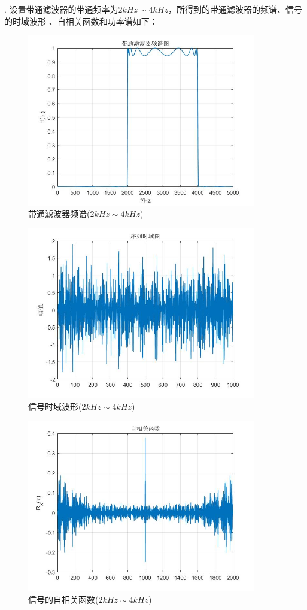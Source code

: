 \documentclass[UTF-8, a4paper, 12pt]{ctexart}
\begin{document}
. 设置带通滤波器的带通频率为$2kHz\sim 4kHz$，所得到的带通滤波器的频谱、信号的时域波形
、自相关函数和功率谱如下：
\begin{figure}[htbp]
    \centering
    \includegraphics[width=10cm]{figs/f21.jpg}
    \caption{带通滤波器频谱($2kHz\sim 4kHz$)}
\end{figure}
\begin{figure}[htbp]
    \centering
    \includegraphics[width=10cm]{figs/f22.jpg}
    \caption{信号时域波形($2kHz\sim 4kHz$)}
    \label{f22}
\end{figure}
\begin{figure}[htbp]
    \centering
    \includegraphics[width=10cm]{figs/f23.jpg}
    \caption{信号的自相关函数($2kHz\sim 4kHz$)}
\end{figure}
\end{document}
